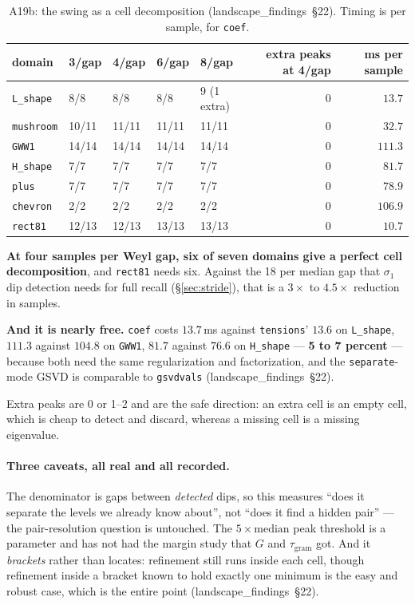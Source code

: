 \documentclass[11pt]{article}
\newcommand{\file}[1]{\texttt{#1}}
\newcommand{\lf}[1]{(landscape\_findings~\S#1)}
\newcommand{\sig}{\sigma}
\newcommand{\sione}{\sig_1}
\begin{document}
\begin{table}[htbp]
\centering
\caption{A19b: the swing as a cell decomposition \lf{22}. Timing is per sample, for
\texttt{coef}.}
\label{tab:a19}
\begin{tabular}{lllllrr}
\toprule
domain & 3/gap & 4/gap & 6/gap & 8/gap & extra peaks at 4/gap & ms per sample \\
\midrule
\file{L\_shape} & 8/8   & 8/8   & 8/8   & 9 (1 extra) & 0 & $13.7$ \\
\file{mushroom} & 10/11 & 11/11 & 11/11 & 11/11       & 0 & $32.7$ \\
\file{GWW1}     & 14/14 & 14/14 & 14/14 & 14/14       & 0 & $111.3$ \\
\file{H\_shape} & 7/7   & 7/7   & 7/7   & 7/7         & 0 & $81.7$ \\
\file{plus}     & 7/7   & 7/7   & 7/7   & 7/7         & 0 & $78.9$ \\
\file{chevron}  & 2/2   & 2/2   & 2/2   & 2/2         & 0 & $106.9$ \\
\file{rect81}   & 12/13 & 12/13 & 13/13 & 13/13       & 0 & $10.7$ \\
\bottomrule
\end{tabular}
\end{table}

\textbf{At four samples per Weyl gap, six of seven domains give a perfect cell decomposition},
and \file{rect81} needs six. Against the 18 per median gap that $\sione$ dip detection needs for
full recall (\S\ref{sec:stride}), that is a $3\times$ to $4.5\times$ reduction in samples.

\textbf{And it is nearly free.} \verb|coef| costs $13.7$\,ms against \verb|tensions|' $13.6$ on
\file{L\_shape}, $111.3$ against $104.8$ on \file{GWW1}, $81.7$ against $76.6$ on
\file{H\_shape} --- \textbf{5 to 7 percent} --- because both need the same regularization and
factorization, and the \verb|separate|-mode GSVD is comparable to \verb|gsvdvals| \lf{22}.

Extra peaks are 0 or 1--2 and are the safe direction: an extra cell is an empty cell, which is
cheap to detect and discard, whereas a missing cell is a missing eigenvalue.

\paragraph{Three caveats, all real and all recorded.} The denominator is gaps between
\emph{detected} dips, so this measures ``does it separate the levels we already know about'', not
``does it find a hidden pair'' --- the pair-resolution question is untouched. The
$5\times\text{median}$ peak threshold is a parameter and has not had the margin study that $G$
and $\tau_{\mathrm{gram}}$ got. And it \emph{brackets} rather than locates: refinement still runs
inside each cell, though refinement inside a bracket known to hold exactly one minimum is the easy
and robust case, which is the entire point \lf{22}.
\end{document}
